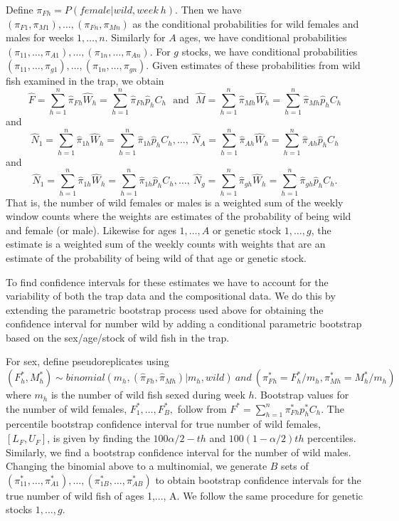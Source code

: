 \documentclass[%
                leqno,         %
%
]{nrc1}                          %
\begin{document}
Define \(\pi_{Fh} = P(female|wild,week \: h)\).  Then we have \((\pi_{F1},\pi_{M1}),\ldots,(\pi_{Fn},\pi_{Mn})\) as the conditional probabilities for wild females and males for weeks \(1,\ldots,n\).  Similarly for $A$ ages, we have conditional probabilities \((\pi_{11}, \ldots, \pi_{A1}), \ldots,(\pi_{1n}, \ldots, \pi_{An})\). For $g$ stocks, we have conditional probabilities \((\pi_{11}, \ldots, \pi_{g1}), \ldots,(\pi_{1n}, \ldots, \pi_{gn})\). Given estimates of these probabilities from wild fish examined in the trap, we obtain  
\[\hat{F} =\sum\limits_{h=1}^{n}\hat{\pi}_{Fh}\hat{W}_h = \sum\limits_{h=1}^{n}\hat{\pi}_{Fh}\hat{p}_{h}C_h ~~~ \mathrm{and}  ~~~ \hat{M} =\sum\limits_{h=1}^{n}\hat{\pi}_{Mh}\hat{W}_h = \sum\limits_{h=1}^{n}\hat{\pi}_{Mh}\hat{p}_{h}C_h \]
and
\[\hat{N}_1 =\sum\limits_{h=1}^{n}\hat{\pi}_{1h}\hat{W}_h = \sum\limits_{h=1}^{n}\hat{\pi}_{1h}\hat{p}_{h}C_h, \ldots, \ \hat{N}_A =\sum\limits_{h=1}^{n}\hat{\pi}_{Ah}\hat{W}_h = \sum\limits_{h=1}^{n}\hat{\pi}_{Ah}\hat{p}_{h}C_{h}\]
and
\[\hat{N}_1 =\sum\limits_{h=1}^{n}\hat{\pi}_{1h}\hat{W}_h = \sum\limits_{h=1}^{n}\hat{\pi}_{1h}\hat{p}_{h}C_h, \ldots, \ \hat{N}_g =\sum\limits_{h=1}^{n}\hat{\pi}_{gh}\hat{W}_h = \sum\limits_{h=1}^{n}\hat{\pi}_{gh}\hat{p}_{h}C_{h}.\]
That is, the number of wild females or males is a weighted sum of the weekly window counts where the weights are estimates of the probability of being wild and female (or male).  Likewise for ages \(1, \ldots, A\) or genetic stock \(1, \ldots, g\), the estimate is a weighted sum of the weekly counts with weights that are an estimate of the probability of being wild of that age or genetic stock.

To find confidence intervals for these estimates we have to account for the variability of both the trap data and the compositional data.  We do this by extending the parametric bootstrap process used above for obtaining the confidence interval for number wild by adding a conditional parametric bootstrap based on the sex/age/stock of wild fish in the trap.

For sex, define pseudoreplicates using
\[(F^*_h,M^*_h) \sim binomial(m_h,(\hat{\pi}_{Fh},\hat{\pi}_{Mh})|m_h, wild) \ and \ (\pi^*_{Fh}=F^*_h/m_h,\pi^*_{Mh}=M^*_h/m_h) \]	  
where \(m_h\)  is the number of wild fish sexed during week $h$.  Bootstrap values for the number of wild females, \(F^*_1,\ldots, F^*_B, \) follow from \(F^*=\sum\limits_{h=1}^{n}\pi^*_{Fh} p^*_{h}C_h \).    The percentile bootstrap confidence interval for true number of wild females, \([L_F,U_F]\), is given by finding the \(100 \alpha/2-th\) and \(100(1-\alpha/2)th\) percentiles.  Similarly, we find a bootstrap confidence interval for the number of wild males.   Changing the binomial above to a multinomial, we generate $B$ sets of \((\pi^*_{11}, \ldots, \pi^*_{A1}), \ldots,(\pi^*_{1B}, \ldots, \pi^*_{AB})\) to obtain bootstrap confidence intervals for the true number of wild fish of ages 1,..., A. We follow the same procedure for genetic stocks $1,\ldots,g$.
\end{document}
